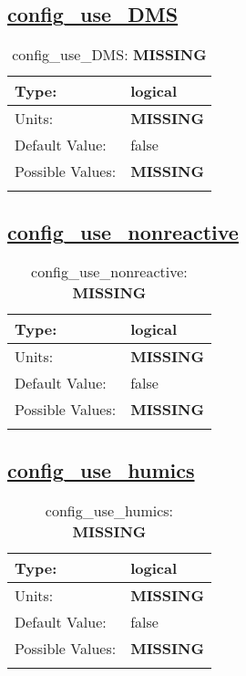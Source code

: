 \subsection[config\_use\_DMS]{\hyperref[sec:nm_tab_biogeochemistry]{config\_use\_DMS}}
\label{subsec:nm_sec_config_use_DMS}
\begin{center}
\begin{longtable}{| p{2.0in} || p{4.0in} |}
    \hline
    Type: & logical \\
    \hline
    Units: & {\bf \color{red} MISSING} \\
    \hline
    Default Value: & false \\
    \hline
    Possible Values: & {\bf \color{red} MISSING} \\
    \hline
    \caption{config\_use\_DMS: {\bf \color{red} MISSING}}
\end{longtable}
\end{center}
\subsection[config\_use\_nonreactive]{\hyperref[sec:nm_tab_biogeochemistry]{config\_use\_nonreactive}}
\label{subsec:nm_sec_config_use_nonreactive}
\begin{center}
\begin{longtable}{| p{2.0in} || p{4.0in} |}
    \hline
    Type: & logical \\
    \hline
    Units: & {\bf \color{red} MISSING} \\
    \hline
    Default Value: & false \\
    \hline
    Possible Values: & {\bf \color{red} MISSING} \\
    \hline
    \caption{config\_use\_nonreactive: {\bf \color{red} MISSING}}
\end{longtable}
\end{center}
\subsection[config\_use\_humics]{\hyperref[sec:nm_tab_biogeochemistry]{config\_use\_humics}}
\label{subsec:nm_sec_config_use_humics}
\begin{center}
\begin{longtable}{| p{2.0in} || p{4.0in} |}
    \hline
    Type: & logical \\
    \hline
    Units: & {\bf \color{red} MISSING} \\
    \hline
    Default Value: & false \\
    \hline
    Possible Values: & {\bf \color{red} MISSING} \\
    \hline
    \caption{config\_use\_humics: {\bf \color{red} MISSING}}
\end{longtable}
\end{center}
